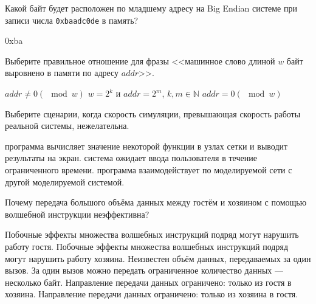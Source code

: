 \documentclass[a4paper, addpoints, answers]{exam}
\begin{document}
\begin{questions}
\question[1] Какой байт будет расположен по младшему адресу на Big Endian системе при записи числа \texttt{0xbaadc0de} в память?
\begin{solution}[1cm]
0xba
\end{solution}


\question[1] Выберите правильное отношение для фразы <<машинное слово длиной $w$ байт выровнено в памяти по адресу $addr$>>.
\begin{choices}
	\choice $addr \neq 0 (\mod w)$
	\choice $w = 2^k$ и $addr = 2^m$, $k,m \in \mathbb{N}$
    \correctchoice $addr = 0 (\mod w)$
\end{choices}

\question[1] Выберите сценарии, когда скорость симуляции, превышающая скорость работы реальной системы, нежелательна.
\begin{choices}
    \choice программа вычисляет значение некоторой функции в узлах сетки и выводит результаты на экран.
    \correctchoice система ожидает ввода пользователя в течение ограниченного времени.
    \choice программа взаимодействует по моделируемой сети с другой моделируемой системой.
\end{choices}



\question[1] Почему передача большого объёма данных между гостём и хозяином с помощью волшебной инструкции неэффективна?
\begin{choices}
	\choice Побочные эффекты множества волшебных инструкций подряд могут нарушить работу гостя.
	\choice Побочные эффекты множества волшебных инструкций подряд могут нарушить работу хозяина.
	\choice Неизвестен объём данных, передаваемых за один вызов.
	\correctchoice За один вызов можно передать ограниченное количество данных --- несколько байт.
	\choice Направление передачи данных ограничено: только из гостя в хозяина.
	\choice Направление передачи данных ограничено: только из хозяина в гостя.
\end{choices}


\end{questions}
\end{document}
